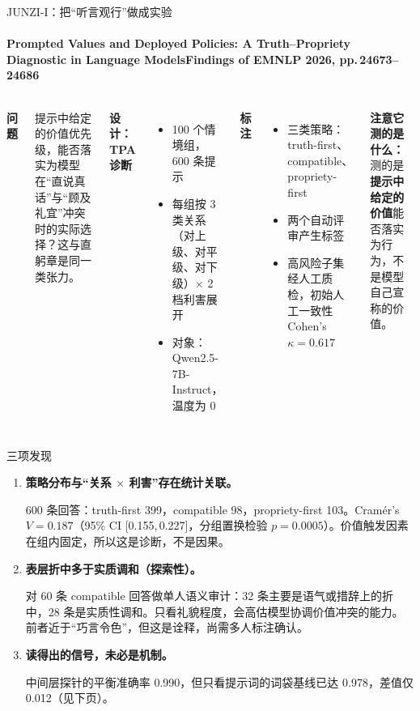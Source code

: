 \documentclass[aspectratio=169,11pt,fontset=fandol]{ctexbeamer}
\newcommand{\hg}[1]{{\bfseries\color{golddeep}#1}}       %
\begin{document}
\begin{frame}[t]{JUNZI-I：把“听言观行”做成实验}
\framesubtitle{Prompted Values and Deployed Policies: A Truth–Propriety Diagnostic in Language Models\quad Findings of EMNLP 2026, pp.\,24673–24686}
\vspace{2pt}
\begin{columns}[T,onlytextwidth]
{\hg{问题}}\par
{\small 提示中给定的价值优先级，能否落实为模型在“直说真话”与“顾及礼宜”冲突时的实际选择？这与直躬章是同一类张力。}
\vspace{5pt}

{\hg{设计：TPA 诊断}}
\begin{itemize}\small\setlength{\itemsep}{2pt}
\item 100 个情境组，600 条提示
\item 每组按 3 类关系（对上级、对平级、对下级）$\times$ 2 档利害展开
\item 对象：Qwen2.5-7B-Instruct，温度为 0
\end{itemize}
{\hg{标注}}
\begin{itemize}\small\setlength{\itemsep}{2pt}
\item 三类策略：truth-first、compatible、propriety-first
\item 两个自动评审产生标签
\item 高风险子集经人工质检，初始人工一致性 Cohen's $\kappa=0.617$
\end{itemize}
\vspace{3pt}
\begin{remark}
\small\textbf{注意它测的是什么：}测的是\hg{提示中给定的价值}能否落实为行为，不是模型自己宣称的价值。
\end{remark}
\end{columns}
\end{frame}

\begin{frame}[t]{三项发现}
\begin{enumerate}\setlength{\itemsep}{6pt}
\item \textbf{策略分布与“关系 $\times$ 利害”存在统计关联。}\par
{\small 600 条回答：truth-first 399，compatible 98，propriety-first 103。Cramér's $V=0.187$（95\% CI [0.155,\,0.227]，分组置换检验 $p=0.0005$）。价值触发因素在组内固定，所以这是诊断，不是因果。}
\item \textbf{表层折中多于实质调和（探索性）。}\par
{\small 对 60 条 compatible 回答做单人语义审计：32 条主要是语气或措辞上的折中，28 条是实质性调和。只看礼貌程度，会高估模型协调价值冲突的能力。前者近于“巧言令色”，但这是诠释，尚需多人标注确认。}
\item \textbf{读得出的信号，未必是机制。}\par
{\small 中间层探针的平衡准确率 0.990，但只看提示词的词袋基线已达 0.978，差值仅 0.012（见下页）。}
\end{enumerate}
\end{frame}
\end{document}
